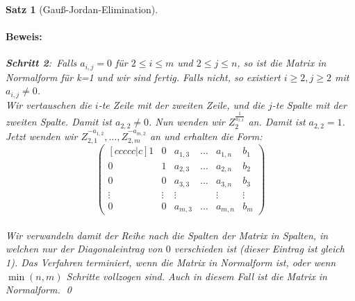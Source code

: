 \documentclass{report}
\theoremstyle{customrem}
\theoremstyle{customdef}
\newtheorem{satz}[definition]{Satz}
\renewenvironment{proof}{\paragraph{Beweis: }}{\qed}
\theoremstyle{customenv}
\begin{document}
\begin{satz}[Gauß-Jordan-Elimination]
\begin{proof}
			\textbf{Schritt 2}:\ Falls \(a_{i,j} = 0\) für \(2 \le i \le m\) und \(2 \le j \le n\), so ist die Matrix in Normalform für k=1 und wir sind fertig. Falls nicht, so existiert \(i \ge 2, j\ge 2\) mit \(a_{i,j} \neq 0\).\\
			Wir vertauschen die \(i\)-te Zeile mit der zweiten Zeile, und die \(j\)-te Spalte mit der zweiten Spalte. Damit ist \(a_{2,2} \neq 0\). Nun wenden wir \(Z_{2}^{\frac{1}{a_{2,2}}}\) an. Damit ist \(a_{2,2} = 1\). Jetzt wenden wir \(Z_{2,1}^{-a_{1,2}}, \dots, Z_{2,m}^{-a_{m,2}}\) an und erhalten die Form:
			\[
			\begin{pmatrix}[ccccc|c]
			1 		& 0 	& a_{1, 3}	& \dots	& a_{1, n} 	& b_1\\
			0 		& 1 	& a_{2, 3}	& \dots & a_{2, n} 	& b_2\\
			0 		& 0 	& a_{3, 3}	& \dots & a_{3, n}	& b_3\\
			\vdots	&\vdots	&\vdots		& 		& \vdots	& \vdots\\
			0 		& 0		& a_{m, 3} 	& \dots & a_{m, n} 	& b_m
			\end{pmatrix}
			\]\\
			Wir verwandeln damit der Reihe nach die Spalten der Matrix in Spalten, in welchen nur der Diagonaleintrag von \(0\) verschieden ist (dieser Eintrag ist gleich 1).
			Das Verfahren terminiert, wenn die Matrix in Normalform ist, oder wenn \(\min(n, m)\) Schritte vollzogen sind. Auch in diesem Fall ist die Matrix in Normalform.
		\end{proof}
	\end{satz}
	
\end{document}
